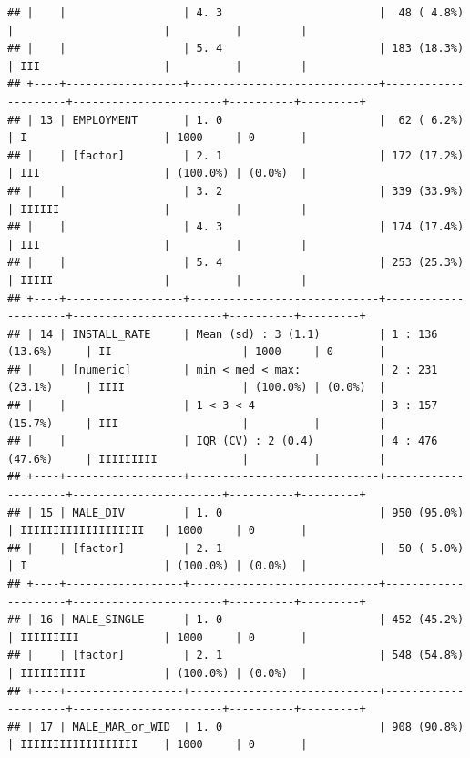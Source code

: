 \documentclass[
]{article}
\begin{document}
\begin{verbatim}
## |    |                  | 4. 3                        |  48 ( 4.8%)         |                       |          |         |
## |    |                  | 5. 4                        | 183 (18.3%)         | III                   |          |         |
## +----+------------------+-----------------------------+---------------------+-----------------------+----------+---------+
## | 13 | EMPLOYMENT       | 1. 0                        |  62 ( 6.2%)         | I                     | 1000     | 0       |
## |    | [factor]         | 2. 1                        | 172 (17.2%)         | III                   | (100.0%) | (0.0%)  |
## |    |                  | 3. 2                        | 339 (33.9%)         | IIIIII                |          |         |
## |    |                  | 4. 3                        | 174 (17.4%)         | III                   |          |         |
## |    |                  | 5. 4                        | 253 (25.3%)         | IIIII                 |          |         |
## +----+------------------+-----------------------------+---------------------+-----------------------+----------+---------+
## | 14 | INSTALL_RATE     | Mean (sd) : 3 (1.1)         | 1 : 136 (13.6%)     | II                    | 1000     | 0       |
## |    | [numeric]        | min < med < max:            | 2 : 231 (23.1%)     | IIII                  | (100.0%) | (0.0%)  |
## |    |                  | 1 < 3 < 4                   | 3 : 157 (15.7%)     | III                   |          |         |
## |    |                  | IQR (CV) : 2 (0.4)          | 4 : 476 (47.6%)     | IIIIIIIII             |          |         |
## +----+------------------+-----------------------------+---------------------+-----------------------+----------+---------+
## | 15 | MALE_DIV         | 1. 0                        | 950 (95.0%)         | IIIIIIIIIIIIIIIIIII   | 1000     | 0       |
## |    | [factor]         | 2. 1                        |  50 ( 5.0%)         | I                     | (100.0%) | (0.0%)  |
## +----+------------------+-----------------------------+---------------------+-----------------------+----------+---------+
## | 16 | MALE_SINGLE      | 1. 0                        | 452 (45.2%)         | IIIIIIIII             | 1000     | 0       |
## |    | [factor]         | 2. 1                        | 548 (54.8%)         | IIIIIIIIII            | (100.0%) | (0.0%)  |
## +----+------------------+-----------------------------+---------------------+-----------------------+----------+---------+
## | 17 | MALE_MAR_or_WID  | 1. 0                        | 908 (90.8%)         | IIIIIIIIIIIIIIIIII    | 1000     | 0       |

\end{verbatim}
\end{document}
